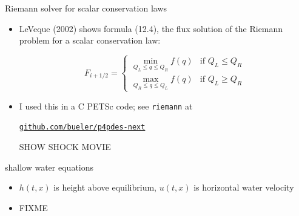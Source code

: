 \documentclass[10pt,hyperref,dvipsnames]{beamer}
\begin{document}
\begin{frame}{Riemann solver for scalar conservation laws}

\begin{itemize}
\item LeVeque (2002) shows formula (12.4), the flux solution of the Riemann problem for a scalar conservation law:

    $$F_{i+1/2} = \begin{cases} {\displaystyle \min_{Q_L \le q \le Q_R} f(q)} & \text{if } Q_L \le Q_R \\ {\displaystyle \max_{Q_R \le q \le Q_L} f(q)} & \text{if } Q_L \ge Q_R \end{cases}$$
\item I used this in a C PETSc code; see \texttt{riemann} at
\begin{center}
\href{https://github.com/bueler/p4pdes-next}{\texttt{github.com/bueler/p4pdes-next}}
\end{center}

\vspace{10mm}
\begin{center}
\alert{SHOW SHOCK MOVIE}
\end{center}
\end{itemize}

\end{frame}


\begin{frame}{shallow water equations}

\begin{itemize}
\item $h(t,x)$ is height above equilibrium, $u(t,x)$ is horizontal water velocity
\item FIXME
\end{itemize}
\end{frame}
\end{document}
